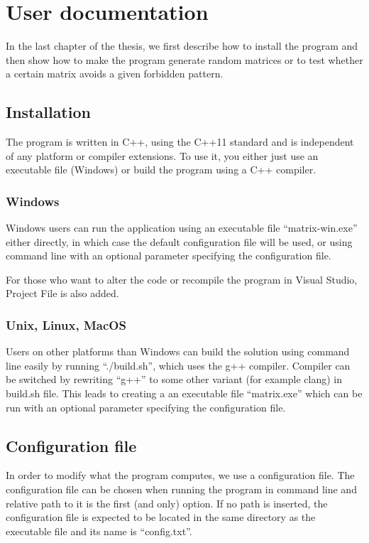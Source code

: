 \chapter{User documentation}
\label{chap:udoc}
In the last chapter of the thesis, we first describe how to install the program and then show how to make the program generate random matrices or to test whether a certain matrix avoids a given forbidden pattern.

\section{Installation}
The program is written in C++, using the C++11 standard and is independent of any platform or compiler extensions. To use it, you either just use an executable file (Windows) or build the program using a C++ compiler.

\subsection{Windows}
Windows users can run the application using an executable file ``matrix-win.exe'' either directly, in which case the default configuration file will be used, or using command line with an optional parameter specifying the configuration file.

For those who want to alter the code or recompile the program in Visual Studio, Project File is also added.

\subsection{Unix, Linux, MacOS}
Users on other platforms than Windows can build the solution using command line easily by running ``./build.sh'', which uses the g++ compiler. Compiler can be switched by rewriting ``g++'' to some other variant (for example clang) in build.sh file. This leads to creating a an executable file ``matrix.exe'' which can be run with an optional parameter specifying the configuration file.

\section{Configuration file}
In order to modify what the program computes, we use a configuration file. The configuration file can be chosen when running the program in command line and relative path to it is the first (and only) option. If no path is inserted, the configuration file is expected to be located in the same directory as the executable file and its name is ``config.txt''.

